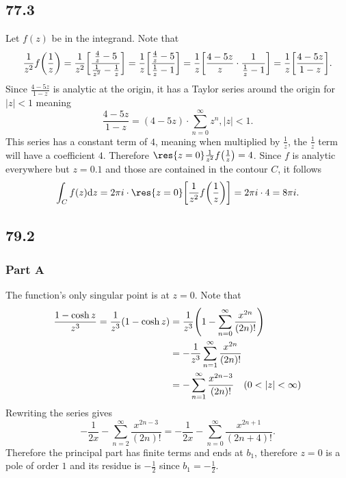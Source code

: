 \documentclass[12pt]{extarticle}
\begin{document}
\subsection*{77.3}
\begin{problem}
    Let $f(z)$ be in the integrand. Note that
    \[
        \frac{1}{z^2} f\qty(\frac{1}{z}) = \frac{1}{z^2} \qty[\frac{\frac{4}{z}-5}{\frac{1}{z^2} - \frac{1}{z}}] = \frac{1}{z} \qty[\frac{\frac{4}{z} - 5}{\frac{1}{z} - 1}] = \frac{1}{z} \qty[\frac{4-5z}{z} \cdot \frac{1}{\frac{1}{z} - 1}] = \frac{1}{z} \qty[\frac{4 - 5z}{1-z}]
    .\]
    Since $\frac{4-5z}{1-z}$ is analytic at the origin, it has a Taylor series around the origin for $|z| < 1$ meaning
    \[
        \frac{4-5z}{1-z} = (4 - 5z)\cdot \sum_{n=0}^\infty z^n, |z| < 1
    .\]
    This series has a constant term of $4$, meaning when multiplied by $\frac{1}{z}$, the $\frac{1}{z}$ term will have a coefficient $4$. Therefore $\res{z=0} \frac{1}{z^2} f\qty(\frac{1}{z}) = 4$. Since $f$ is analytic everywhere but $z = \qty{0, 1}$ and those are contained in the contour $C$, it follows
    \[
        \int_C f(z) \dd z = 2 \pi i \cdot \res{z=0}\qty[\frac{1}{z^2} f\qty(\frac{1}{z})] = 2 \pi i \cdot 4 = 8 \pi i
    .\]
\end{problem}

\subsection*{79.2}
\begin{problem} \subsubsection*{Part A}
    The function's only singular point is at $z=0$. Note that
    \begin{align*}
        \frac{1-\cosh z}{z^3} = \frac{1}{z^3} (1 - \cosh z) &= \frac{1}{z^3} \qty(1 - \sum_{n=0}^\infty \frac{x^{2n}}{(2n)!}) \\
        &= -\frac{1}{z^3} \sum_{n=1}^\infty \frac{x^{2n}}{(2n)!} \\
        &= -\sum_{n=1}^\infty \frac{x^{2n-3}}{(2n)!} \hspace{1em} (0 < |z| < \infty)
    \end{align*}
    Rewriting the series gives
    \[
        -\frac{1}{2x} - \sum_{n=2}^\infty \frac{x^{2n-3}}{(2n)!} = -\frac{1}{2x} - \sum_{n=0}^\infty \frac{x^{2n+1}}{(2n+4)!}
    .\]
    Therefore the principal part has finite terms and ends at $b_1$, therefore $z = 0$ is a pole of order $1$ and its residue is $-\frac{1}{2}$ since $b_1 = -\frac{1}{2}$.
\end{problem}
\end{document}
